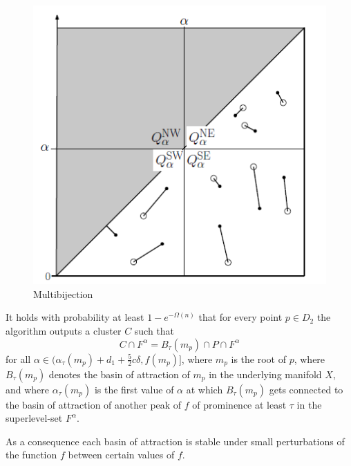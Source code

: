 \documentclass{beamer}
\theoremstyle{definition}
\begin{document}
\begin{frame}
\begin{figure}
\centering
\includegraphics[scale=0.8]{multibijection}
\caption{Multibijection}
\end{figure}
\end{frame}
\begin{frame}
\begin{theorem}
 It holds with probability at least $1 - e^{-\Omega(n)}$ that for every point $p \in D_2$ the algorithm outputs
a cluster $C$ such that \[C \cap F^\alpha = B_\tau (m_p) \cap P \cap F^\alpha\] for all $\alpha \in(\alpha_\tau (m_p) + d_1 +
\frac{5}{2}c\delta, f(m_p)]$, where $m_p$ is the root of $p$, where $B_\tau (m_p)$ denotes 
the basin of attraction of $m_p$ in the underlying manifold $X$, and where $\alpha_\tau(m_p)$ is the first value of $\alpha$ at which $B_\tau(m_p)$ gets connected to the basin of attraction of another peak of
$f$ of prominence at least $\tau$ in the superlevel-set $F^\alpha$.
\end{theorem}\pause
As a consequence each basin of attraction is stable under small perturbations of the function $f$ between certain values of $f$. %
\end{frame}
\end{document}
